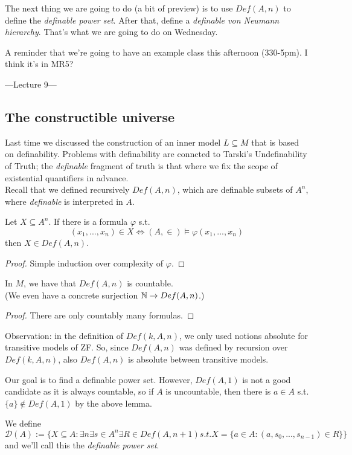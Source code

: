 \documentclass[a4paper]{article}
\begin{document}
The next thing we are going to do (a bit of preview) is to use $Def(A,n)$ to define the \emph{definable power set}. After that, define a \emph{definable von Neumann hierarchy}. That's what we are going to do on Wednesday.

A reminder that we're going to have an example class this afternoon (330-5pm). I think it's in MR5?

---Lecture 9---

\subsection{The constructible universe}

Last time we discussed the construction of an inner model $L \subseteq M$ that is based on definability. Problems with definability are conncted to Tarski's Undefinability of Truth; the \emph{definable} fragment of truth is that where we fix the scope of existential quantifiers in advance.\\
Recall that we defined recursively $Def(A,n)$, which are definable subsets of $A^n$, where \emph{definable} is interpreted in $A$.

\begin{lemma}
Let $X \subseteq A^n$. If there is a formula $\varphi$ s.t. 
\[
(x_1,...,x_n) \in X \iff (A,\in) \vDash \varphi(x_1,...,x_n)
\]
then $X \in Def(A,n)$.
\begin{proof}
Simple induction over complexity of $\varphi$.
\end{proof}
\end{lemma}

\begin{lemma}
In $M$, we have that $Def(A,n)$ is countable.\\
(We even have a concrete surjection $\mathbb{N} \to Def(A,n)$.)
\begin{proof}
There are only countably many formulas.
\end{proof}
\end{lemma}
Observation: in the definition of $Def(k,A,n)$, we only used notions absolute for transitive models of ZF. So, since $Def(A,n)$ was defined by recursion over $Def(k,A,n)$, also $Def(A,n)$ is absolute between transitive models.

Our goal is to find a definable power set. However, $Def(A,1)$ is not a good candidate as it is always countable, so if $A$ is uncountable, then there is $a \in A$ s.t. $\{a\} \not\in Def(A,1)$ by the above lemma.

We define
\[
\mathcal{D}(A) := \{X \subseteq A: \exists n \exists s \in A^n \exists R \in Def(A,n+1) s.t. X = \{a \in A: (a,s_0,...,s_{n-1}) \in R	\}\}
\]
and we'll call this the \emph{definable power set}.
\end{document}
